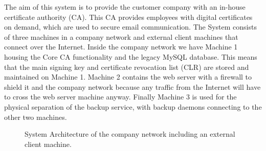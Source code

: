 \documentclass[english]{article}
\begin{document}

The aim of this system is to provide the customer company with an in-house certificate authority (CA). This CA provides
employees with digital certificates on demand, which are used to secure email communication. 
The System consists of three machines in a company network and external client machines that connect over the Internet. 
Inside the company network we have Machine 1 housing the Core CA functionality and the legacy MySQL database. This means
that the main signing key and certificate revocation list (CLR) are stored and maintained on Machine 1. %
Machine 2 contains the web server with a firewall to shield it and the company network because any traffic from the 
Internet will have to cross the web server machine anyway. Finally Machine 3 is used for the physical separation of the 
backup service, with backup daemons connecting to the other two machines. 



\begin{figure}[htb!]
\caption{System Architecture of the company network including an external client machine.}
\centering
\label{fig:system_arch}
\end{figure}
\end{document}
